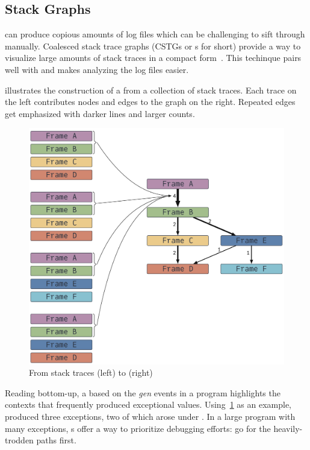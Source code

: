 \documentclass{juliacon}
\begin{document}
\subsection{Stack Graphs}
\label{s:cstg}

\FT{} can produce copious amounts of log files which can be challenging to sift through manually.
Coalesced stack trace graphs (CSTGs or \CSTG{}s for short) provide a way to visualize large amounts of stack traces in a compact form~\cite{humphreySystematicDebuggingMethods2014}.
This techinque pairs well with \FT{} and makes analyzing the log files easier.

 illustrates the construction of a \CSTG{} from a collection of stack traces.
Each trace on the left contributes nodes and edges to the graph on the right.
Repeated edges get emphasized with darker lines and larger counts.

\begin{figure}[t]
  \centering
  \includegraphics[width=0.9\columnwidth]{./fig/cstg_static_diagram.pdf}
  \caption{From stack traces (left) to \CSTG{} (right)}
  \label{fig:cstg_demo}
\end{figure}

Reading bottom-up, a \CSTG{} based on the \emph{gen} events in a program
highlights the contexts that frequently produced exceptional values.
Using~\cref{fig:cstg_demo} as an example,  produced
three exceptions, two of which arose under .
In a large program with many exceptions, \CSTG{}s offer a way to prioritize
debugging efforts: go for the heavily-trodden paths first.
\end{document}

